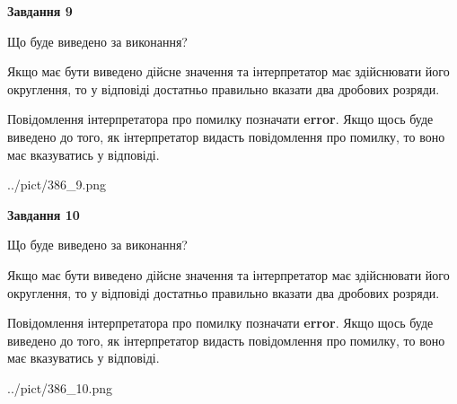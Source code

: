 \documentclass[12pt, ukrainian]{article}
\begin{document}
{\begin {Large}
{\begin {center}\textbf{Завдання 9}\end {center}}\par
Що буде виведено за виконання? \par

Якщо має бути виведено дійсне значення та інтерпретатор має здійснювати його округлення, 
то у відповіді достатньо правильно вказати два дробових розряди.

Повідомлення інтерпретатора про помилку позначати \textbf{error}.
Якщо щось буде виведено до того, як інтерпретатор видасть повідомлення про помилку, 
то воно має вказуватись у відповіді. \par

\begin{center}
	{../pict/386_9.png}
\end{center}
\newpage

{\begin {center}\textbf{Завдання 10}\end {center}}\par
Що буде виведено за виконання? \par

Якщо має бути виведено дійсне значення та інтерпретатор має здійснювати його округлення, 
то у відповіді достатньо правильно вказати два дробових розряди.

Повідомлення інтерпретатора про помилку позначати \textbf{error}.
Якщо щось буде виведено до того, як інтерпретатор видасть повідомлення про помилку, 
то воно має вказуватись у відповіді. \par

\begin{center}
	{../pict/386_10.png}
\end{center}
\newpage

\end {Large}}
\end{document}
